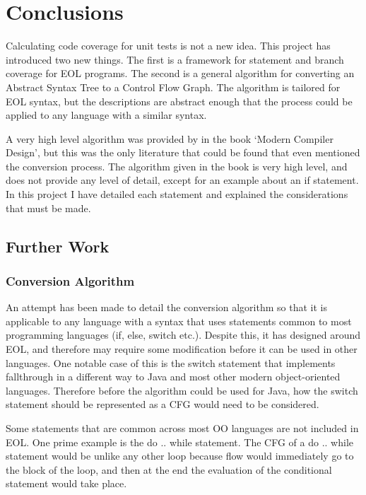\chapter{Conclusions}

Calculating code coverage for unit tests is not a new idea. This project has introduced two new things. The first is a framework for statement and branch coverage for EOL programs. The second is a general algorithm for converting an Abstract Syntax Tree to a Control Flow Graph. The algorithm is tailored for EOL syntax, but the descriptions are abstract enough that the process could be applied to any language with a similar syntax. 

A very high level algorithm was provided by \citet{grune2000modern} in the book `Modern Compiler Design', but this was the only literature that could be found that even mentioned the conversion process. The algorithm given in the book is very high level, and does not provide any level of detail, except for an example about an if statement. In this project I have detailed each statement and explained the considerations that must be made. 

\section{Further Work}

\subsection{Conversion Algorithm}

An attempt has been made to detail the conversion algorithm so that it is applicable to any language with a syntax that uses statements common to most programming languages (if, else, switch etc.). Despite this, it has designed around EOL, and therefore may require some modification before it can be used in other languages. One notable case of this is the switch statement that implements fallthrough in a different way to Java and most other modern object-oriented languages. Therefore before the algorithm could be used for Java, how the switch statement should be represented as a CFG would need to be considered. 

Some statements that are common across most OO languages are not included in EOL. One prime example is the do .. while statement. The CFG of a do .. while statement would be unlike any other loop because flow would immediately go to the block of the loop, and then at the end the evaluation of the conditional statement would take place.

